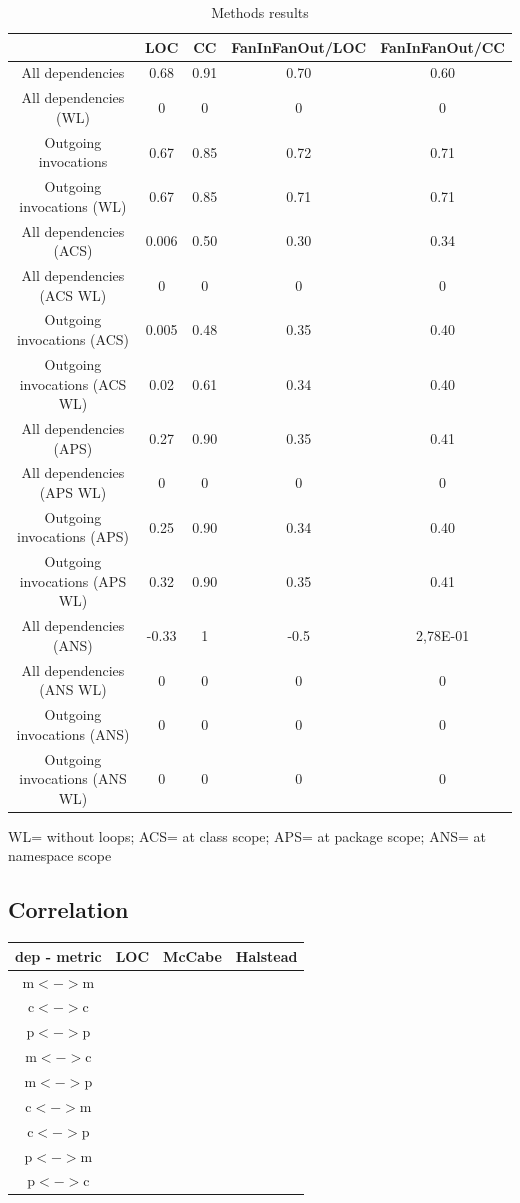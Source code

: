 \documentclass{sig-alternate}
\begin{document}
\begin{table}
\begin{tabular}{|c|c|c|c|c|}
\hline 
 & LOC & CC & FanInFanOut/LOC & FanInFanOut/CC\tabularnewline
\hline 
\hline 
All dependencies  & 0.68 & 0.91 & 0.70 & 0.60\tabularnewline
\hline 
All dependencies (WL) & 0 & 0 & 0 & 0\tabularnewline
\hline 
Outgoing invocations & 0.67 & 0.85 & 0.72 & 0.71\tabularnewline
\hline 
Outgoing invocations (WL) & 0.67 & 0.85 & 0.71 & 0.71\tabularnewline
\hline 
All dependencies (ACS) & 0.006 & 0.50 & 0.30 & 0.34\tabularnewline
\hline 
All dependencies (ACS WL) & 0 & 0 & 0 & 0\tabularnewline
\hline 
Outgoing invocations (ACS) & 0.005 & 0.48 & 0.35 & 0.40\tabularnewline
\hline 
Outgoing invocations (ACS WL) & 0.02 & 0.61 & 0.34 & 0.40\tabularnewline
\hline 
All dependencies (APS) & 0.27 & 0.90 & 0.35 & 0.41\tabularnewline
\hline 
All dependencies (APS WL) & 0 & 0 & 0 & 0\tabularnewline
\hline 
Outgoing invocations (APS) & 0.25 & 0.90 & 0.34 & 0.40\tabularnewline
\hline 
Outgoing invocations (APS WL) & 0.32 & 0.90 & 0.35 & 0.41\tabularnewline
\hline 
All dependencies (ANS) & -0.33 & 1 & -0.5 & 2,78E-01\tabularnewline
\hline 
All dependencies (ANS WL) & 0 & 0 & 0 & 0\tabularnewline
\hline 
Outgoing invocations (ANS) & 0 & 0 & 0 & 0\tabularnewline
\hline 
Outgoing invocations (ANS WL) & 0 & 0 & 0 & 0\tabularnewline
\hline 
\end{tabular}

\medskip{}
WL= without loops; ACS= at class scope; APS= at package scope; ANS= at namespace scope
\caption{Methods results}



\end{table}

\subsection{Correlation}

\begin{tabular}{|c|c|c|c|}\hline
dep - metric  & LOC & McCabe & Halstead\\\hline
m$<->$m	&	& & \\\hline
c$<->$c	&	& & \\\hline
p$<->$p	&	& & \\\hline
m$<->$c	&	& & \\\hline
m$<->$p	&	& & \\\hline
c$<->$m	&	& & \\\hline
c$<->$p	&	& & \\\hline
p$<->$m	&	& & \\\hline
p$<->$c	&	& & \\\hline
\end{tabular}
\end{document}
